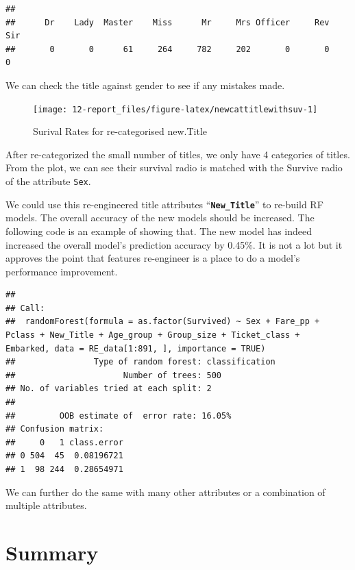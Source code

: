\documentclass[
]{book}
\begin{document}
\begin{verbatim}
## 
##      Dr    Lady  Master    Miss      Mr     Mrs Officer     Rev     Sir 
##       0       0      61     264     782     202       0       0       0
\end{verbatim}

We can check the title against gender to see if any mistakes made.

\begin{figure}

{\centering \texttt{[image: 12-report\_files/figure-latex/newcattitlewithsuv-1]} 

}

\caption{Surival Rates for re-categorised new.Title}\label{fig:newcattitlewithsuv}
\end{figure}

After re-categorized the small number of titles, we only have 4 categories of titles. From the plot, we can see their survival radio is matched with the Survive radio of the attribute \texttt{Sex}.

We could use this re-engineered title attributes ``\textbf{\texttt{New\_Title}}'' to re-build RF models. The overall accuracy of the new models should be increased. The following code is an example of showing that. The new model has indeed increased the overall model's prediction accuracy by 0.45\%. It is not a lot but it approves the point that features re-engineer is a place to do a model's performance improvement.

\begin{verbatim}
## 
## Call:
##  randomForest(formula = as.factor(Survived) ~ Sex + Fare_pp +      Pclass + New_Title + Age_group + Group_size + Ticket_class +      Embarked, data = RE_data[1:891, ], importance = TRUE) 
##                Type of random forest: classification
##                      Number of trees: 500
## No. of variables tried at each split: 2
## 
##         OOB estimate of  error rate: 16.05%
## Confusion matrix:
##     0   1 class.error
## 0 504  45  0.08196721
## 1  98 244  0.28654971
\end{verbatim}

We can further do the same with many other attributes or a combination of multiple attributes.

\hypertarget{summary-10}{%
\section*{Summary}\label{summary-10}}
\end{document}
